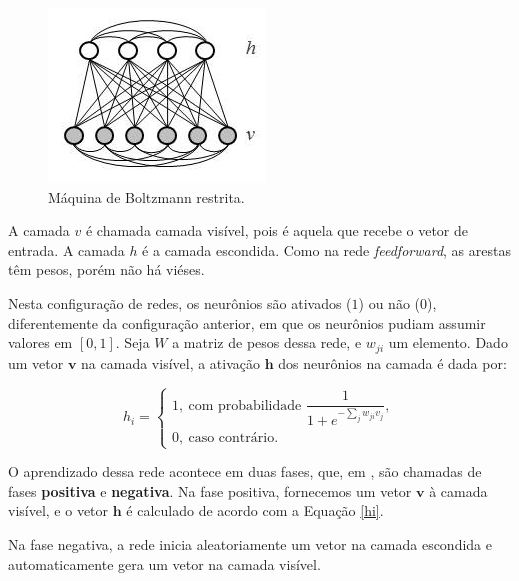 \documentclass{article}
\begin{document}
            \begin{figure}[h!]
                \centering
                \includegraphics[scale=0.5]{Images/Restricted Boltzmann machine.png}
                \caption{Máquina de Boltzmann restrita.}
                \label{fig3}
            \end{figure}

            A camada $v$ é chamada camada visível, pois é aquela que recebe o vetor de entrada.
            A camada $h$ é a camada escondida. Como na rede \textit{feedforward}, as arestas têm pesos, porém não há viéses.

            Nesta configuração de redes, os neurônios são ativados ($1$) ou não ($0$), diferentemente da configuração anterior, em que os neurônios pudiam assumir valores em $[0, 1]$.
            Seja $W$ a matriz de pesos dessa rede, e $w_{ji}$ um elemento.
            Dado um vetor $\mathbf{v}$ na camada visível, a ativação $\mathbf{h}$ dos neurônios na camada é dada por:

            \begin{equation}
                h_i =   \begin{cases}
                            1, \ \textrm{com probabilidade } \dfrac{1}{1 + e^{-\sum_j w_{ji} v_j}},\\
                            0, \ \textrm{caso contrário}.
                        \end{cases}
                \label{hi}
            \end{equation}

            O aprendizado dessa rede acontece em duas fases, que, em \cite{testolin2018deep}, são chamadas de fases \textbf{positiva} e \textbf{negativa}.
            Na fase positiva, fornecemos um vetor $\mathbf{v}$ à camada visível, e o vetor $\mathbf{h}$ é calculado de acordo com a Equação \ref{hi}.

            Na fase negativa, a rede inicia aleatoriamente um vetor na camada escondida e automaticamente gera um vetor na camada visível.
\end{document}
